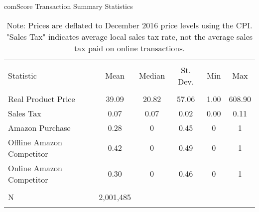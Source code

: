 
\begin{table}[!htbp] \centering
  \caption{comScore Transaction Summary Statistics}
  \label{tab:comScoreSummary}
\begin{tabular}{@{\extracolsep{5pt}}lccccc}
\\[-1.8ex]\hline
\hline \\[-1.8ex]
Statistic & \multicolumn{1}{c}{Mean} & \multicolumn{1}{c}{Median} & \multicolumn{1}{c}{St. Dev.} & \multicolumn{1}{c}{Min} & \multicolumn{1}{c}{Max} \\
\hline \\[-1.8ex]
Real Product Price & 39.09 & 20.82 & 57.06 & 1.00 & 608.90 \\
Sales Tax & 0.07 & 0.07 & 0.02 & 0.00 & 0.11 \\
Amazon Purchase & 0.28 & 0 & 0.45 & 0 & 1 \\
Offline Amazon Competitor & 0.42 & 0 & 0.49 & 0 & 1 \\
Online Amazon Competitor & 0.30 & 0 & 0.46 & 0 & 1 \\
\hline \\[-1.8ex]
N & \multicolumn{1}{c}{2,001,485} \\
\hline \\[-1.8ex]
\end{tabular}
\caption*{Note: Prices are deflated to December 2016 price levels using the CPI. "Sales Tax" indicates average local sales tax rate, not the average sales tax paid on online transactions.}
\end{table}
